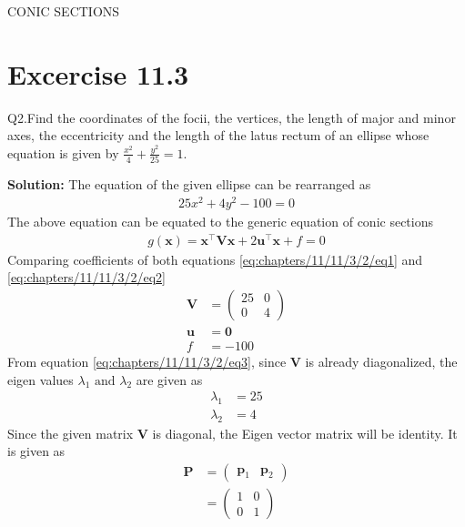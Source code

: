 \documentclass[12pt]{article}
\providecommand{\brak}[1]{\ensuremath{\left(#1\right)}}
\newcommand{\solution}{\noindent \textbf{Solution: }}
\newcommand{\myvec}[1]{\ensuremath{\begin{pmatrix}#1\end{pmatrix}}}
\let\vec\mathbf
\begin{document}
\begin{center}
\textbf\large{CONIC SECTIONS}

\end{center}
\section*{Excercise 11.3}
Q2.Find the coordinates of the focii, the vertices, the length of major and minor axes, the eccentricity and the length of the latus rectum of an ellipse whose equation is given by $\frac{x^2}{4}+\frac{y^2}{25}=1$.

\solution
\fi
The equation of the given ellipse can be rearranged as 
\begin{align}
	\label{eq:chapters/11/11/3/2/eq1}
	25x^2+4y^2-100=0
\end{align}
The above equation can be equated to the generic equation of conic sections
\begin{align}
	\label{eq:chapters/11/11/3/2/eq2}
	g\brak{\vec{x}}=\vec{x}^\top \vec{V} \vec{x} + 2\vec{u}^\top \vec{x} + f = 0
\end{align}
Comparing coefficients of both equations \eqref{eq:chapters/11/11/3/2/eq1} and \eqref{eq:chapters/11/11/3/2/eq2}
\begin{align}
	\label{eq:chapters/11/11/3/2/eq3}
	\vec{V} &= \myvec{25&0\\0&4}\\
	\vec{u} &= \vec{0}\\
	f &= -100
\end{align}
From equation \eqref{eq:chapters/11/11/3/2/eq3}, since $\vec{V}$ is already diagonalized, the eigen values $\lambda_1 \text{ and } \lambda_2$ are given as
\begin{align}
	\lambda_1 &= 25\\
	\lambda_2 &= 4
\end{align}
Since the given matrix $\vec{V}$ is diagonal, the Eigen vector matrix will be identity. It is given as
\begin{align}
	\vec{P} &= \myvec{\vec{p}_1 & \vec{p}_2}\\
		&= \myvec{1&0\\0&1}
\end{align}
\end{document}
